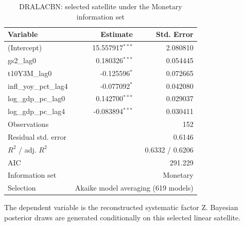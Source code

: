 \begin{table}[!htbp]
\centering
\caption{DRALACBN: selected satellite under the Monetary information set}
\label{tab:dralacbn_monetary_satellite}
\begin{tabular}{lrr}
\toprule
Variable & Estimate & Std. Error \\
\midrule
(Intercept) & 15.557917$^{***}$ & 2.080810 \\
gs2_lag0 & 0.180326$^{***}$ & 0.054445 \\
t10Y3M_lag0 & -0.125596$^{*}$ & 0.072665 \\
infl_yoy_pct_lag4 & -0.077092$^{*}$ & 0.042080 \\
log_gdp_pc_lag0 & 0.142700$^{***}$ & 0.029037 \\
log_gdp_pc_lag4 & -0.083894$^{***}$ & 0.030411 \\
\midrule
Observations & \multicolumn{2}{r}{152} \\
Residual std. error & \multicolumn{2}{r}{0.6146} \\
$R^2$ / adj. $R^2$ & \multicolumn{2}{r}{0.6332 / 0.6206} \\
AIC & \multicolumn{2}{r}{291.229} \\
Information set & \multicolumn{2}{r}{Monetary} \\
Selection & \multicolumn{2}{r}{Akaike model averaging (619 models)} \\
\bottomrule
\end{tabular}
\begin{tablenotes}
\small
\item The dependent variable is the reconstructed systematic factor Z. Bayesian posterior draws are generated conditionally on this selected linear satellite.
\end{tablenotes}
\end{table}
